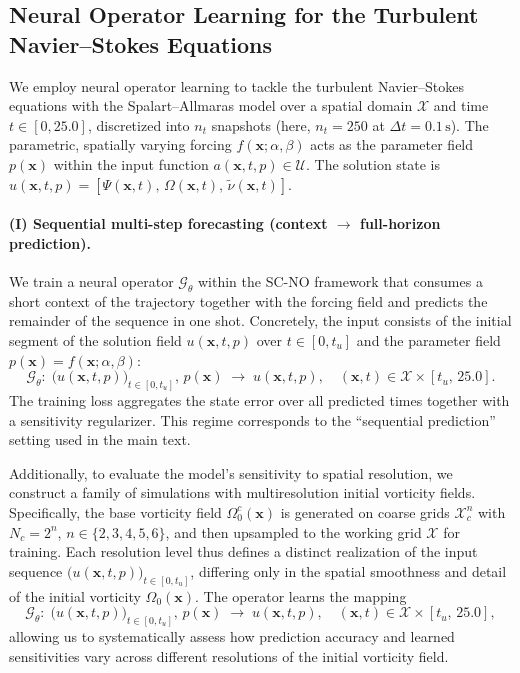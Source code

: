 \subsection*{Neural Operator Learning for the Turbulent Navier--Stokes Equations}

We employ neural operator learning to tackle the turbulent Navier--Stokes equations with the Spalart--Allmaras model over a spatial domain $\mathcal{X}$ and time $t \in [0, 25.0]$, discretized into $n_t$ snapshots (here, $n_t=250$ at $\Delta t=0.1\,\mathrm{s}$). The parametric, spatially varying forcing $f(\mathbf{x}; \alpha,\beta)$ acts as the parameter field $p(\mathbf{x})$ within the input function $a(\mathbf{x}, t, p)\in\mathcal{U}$. The solution state is $u(\mathbf{x}, t, p) = [\Psi(\mathbf{x}, t),\, \Omega(\mathbf{x}, t),\, \tilde{\nu}(\mathbf{x}, t)]$.

\paragraph{(I) Sequential multi-step forecasting (context $\rightarrow$ full-horizon prediction).}
We train a neural operator $\mathcal{G}_\theta$ within the SC-NO framework that consumes a short context of the trajectory together with the forcing field and predicts the remainder of the sequence in one shot. Concretely, the input consists of the initial segment of the solution field \( u(\mathbf{x}, t, p) \) over \( t \in [0, t_u] \) and the parameter field \( p(\mathbf{x}) = f(\mathbf{x}; \alpha, \beta) \):
\[
\mathcal{G}_\theta:\; \big(u(\mathbf{x}, t, p)\big)_{t \in [0, t_u]},\, p(\mathbf{x})\;\longrightarrow\; u(\mathbf{x}, t, p),
\quad (\mathbf{x}, t) \in \mathcal{X} \times [t_u,\,25.0].
\]
The training loss aggregates the state error over all predicted times together with a sensitivity regularizer. This regime corresponds to the “sequential prediction” setting used in the main text.



Additionally, to evaluate the model’s sensitivity to spatial resolution, we construct a family of simulations with multiresolution initial vorticity fields. Specifically, the base vorticity field \( \Omega_0^c(\mathbf{x}) \) is generated on coarse grids \( \mathcal{X}_c^n \) with \( N_c = 2^n \), \( n \in \{2,3,4,5,6\} \), and then upsampled to the working grid \( \mathcal{X} \) for training. Each resolution level thus defines a distinct realization of the input sequence \( \big(u(\mathbf{x}, t, p)\big)_{t \in [0, t_u]} \), differing only in the spatial smoothness and detail of the initial vorticity \( \Omega_0(\mathbf{x}) \). The operator learns the mapping  
\[
\mathcal{G}_\theta:\; \big(u(\mathbf{x}, t, p)\big)_{t \in [0, t_u]},\, p(\mathbf{x})\;\longrightarrow\; u(\mathbf{x}, t, p),
\quad (\mathbf{x}, t) \in \mathcal{X} \times [t_u,\,25.0],
\]
allowing us to systematically assess how prediction accuracy and learned sensitivities vary across different resolutions of the initial vorticity field.





